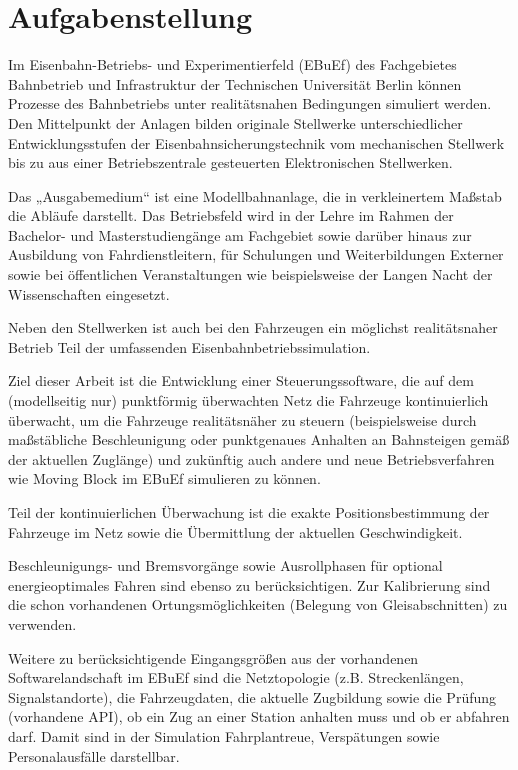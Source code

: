 \section*{Aufgabenstellung}

Im Eisenbahn-Betriebs- und Experimentierfeld (EBuEf) des Fachgebietes Bahnbetrieb und Infrastruktur der Technischen Universität Berlin können Prozesse des Bahnbetriebs unter realitätsnahen Bedingungen simuliert werden. Den Mittelpunkt der Anlagen bilden originale Stellwerke unterschiedlicher Entwicklungsstufen der Eisenbahnsicherungstechnik vom mechanischen Stellwerk bis zu aus einer Betriebszentrale gesteuerten Elektronischen Stellwerken.

Das „Ausgabemedium“ ist eine Modellbahnanlage, die in verkleinertem Maßstab die Abläufe darstellt. Das Betriebsfeld wird in der Lehre im Rahmen der Bachelor- und Masterstudiengänge am Fachgebiet sowie darüber hinaus zur Ausbildung von Fahrdienstleitern, für Schulungen und Weiterbildungen Externer sowie bei öffentlichen Veranstaltungen wie beispielsweise der Langen Nacht der Wissenschaften eingesetzt.

Neben den Stellwerken ist auch bei den Fahrzeugen ein möglichst realitätsnaher Betrieb Teil der umfassenden Eisenbahnbetriebssimulation.

Ziel dieser Arbeit ist die Entwicklung einer Steuerungssoftware, die auf dem (modellseitig nur) punktförmig überwachten Netz die Fahrzeuge kontinuierlich überwacht, um die Fahrzeuge realitätsnäher zu steuern (beispielsweise durch maßstäbliche Beschleunigung oder punktgenaues Anhalten an Bahnsteigen gemäß der aktuellen Zuglänge) und zukünftig auch andere und neue Betriebsverfahren wie Moving Block im EBuEf simulieren zu können.

Teil der kontinuierlichen Überwachung ist die exakte Positionsbestimmung der Fahrzeuge im Netz sowie die Übermittlung der aktuellen Geschwindigkeit.

Beschleunigungs- und Bremsvorgänge sowie Ausrollphasen für optional energieoptimales Fahren sind ebenso zu berücksichtigen. Zur Kalibrierung sind die schon vorhandenen Ortungsmöglichkeiten (Belegung von Gleisabschnitten) zu verwenden.

Weitere zu berücksichtigende Eingangsgrößen aus der vorhandenen Softwarelandschaft im EBuEf sind die Netztopologie (z.B. Streckenlängen, Signalstandorte), die Fahrzeugdaten, die aktuelle Zugbildung sowie die Prüfung (vorhandene API), ob ein Zug an einer Station anhalten muss und ob er abfahren darf. Damit sind in der Simulation Fahrplantreue, Verspätungen sowie Personalausfälle darstellbar.

